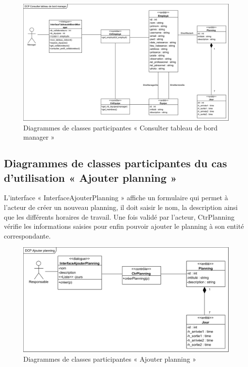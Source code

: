 \begin{figure}[h!]
    \centering
    \includegraphics[scale=0.68,angle=90]{images/DCP/DCP Consulter tableau de bord manager.png}
    \caption{Diagrammes de classes participantes « Consulter tableau de bord manager »}
    \label{fig27}
    \end{figure}

\clearpage
       
\subsection*{Diagrammes de classes participantes du cas d'utilisation « Ajouter planning »}
L’interface « InterfaceAjouterPlanning » affiche un formulaire qui permet à 
l’acteur de créer un nouveau planning, il doit saisir le nom, la description 
ainsi que les différents horaires de travail.
Une fois validé par l’acteur, CtrPlanning vérifie les informations saisies 
pour enfin pouvoir ajouter le planning à son entité correspondante.
           
\begin{figure}[h!]
    \centering
    \includegraphics[scale=0.88]{images/DCP/DCP Ajouter planning.png}
    \caption{Diagrammes de classes participantes « Ajouter planning »}
    \label{fig28}
\end{figure}
        
